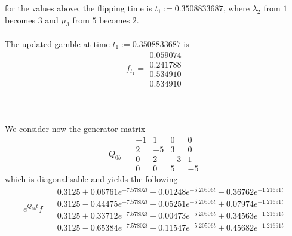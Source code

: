 \documentclass{article}
\begin{document}
for the values above, the flipping time is $t_{1}:= 0.3508833687$, where $\lambda_{2}$ from $1$ becomes $3$ and $\mu_{3}$ from $5$ becomes $2$.\\\\
The updated gamble at time $t_{1}:= 0.3508833687$ is
\begin{equation*}  
 f_{t_1}= 
 \begin{array}{|c|}
  0.059074\\
  0.241788\\
  0.534910\\
  0.534910  
 \end{array}
 \end{equation*}\\\\\\
We consider now the generator matrix 
\begin{equation*} 
 Q_{0b}= 
 \begin{array}{|rrrr|}
  -1 & 1 & 0 & 0 \\
  2 & -5 & 3 & 0 \\
  0 & 2 & -3 & 1 \\
  0 & 0 & 5 & -5 
 \end{array}
 \end{equation*}
which is diagonalisable and yields the following
\begin{equation*} 
 e^{Q_{0b}t}f= 
 \begin{array}{|r|}
  0.3125+0.06761e^{-7.57802t}- 0.01248e^{-5.20506t}- 0.36762e^{-1.21691t}\\
  0.3125-0.44475e^{-7.57802t}+ 0.05251e^{-5.20506t}+ 0.07974e^{-1.21691t}\\
  0.3125+0.33712e^{-7.57802t}+ 0.00473e^{-5.20506t}+ 0.34563e^{-1.21691t}\\
  0.3125-0.65384e^{-7.57802t}- 0.11547e^{-5.20506t}+ 0.45682e^{-1.21691t}  
 \end{array}
 \end{equation*}
\end{document}
